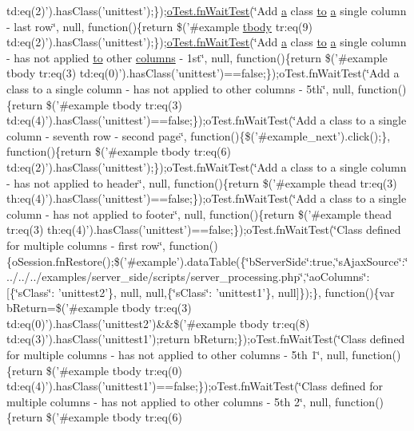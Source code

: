 \begin{DoxyCompactItemize}
td\+:eq(2)').has\+Class('unittest');\});\hyperlink{onhold_24__server-side_2__zero__config_8js_ab25c4d596771c0133cdc45178ce72c3d}{o\+Test.\+fn\+Wait\+Test}(\char`\"{}Add \hyperlink{media_2js_2jquery_8js_aa4d4888597588a84fd5b1184d00c91f3}{a} class \hyperlink{jquery-ui_8js_af6086621f45baa2cf538f19e45d3c263}{to} \hyperlink{media_2js_2jquery_8js_aa4d4888597588a84fd5b1184d00c91f3}{a} single column -\/ last row\char`\"{}, null, function()\{return \$('\#example \hyperlink{core_8constructor_8js_a99b0542c7c50fe8757c55bf9dac5f3be}{tbody} tr\+:eq(9) td\+:eq(2)').has\+Class('unittest');\});\hyperlink{onhold_24__server-side_2__zero__config_8js_ab25c4d596771c0133cdc45178ce72c3d}{o\+Test.\+fn\+Wait\+Test}(\char`\"{}Add \hyperlink{media_2js_2jquery_8js_aa4d4888597588a84fd5b1184d00c91f3}{a} class \hyperlink{jquery-ui_8js_af6086621f45baa2cf538f19e45d3c263}{to} \hyperlink{media_2js_2jquery_8js_aa4d4888597588a84fd5b1184d00c91f3}{a} single column -\/ has not applied \hyperlink{jquery-ui_8js_af6086621f45baa2cf538f19e45d3c263}{to} other \hyperlink{model_8defaults_8columns_8js_af310571d7a4fac04bd949bdefb852a47}{columns} -\/ 1st\char`\"{}, null, function()\{return \$('\#example tbody tr\+:eq(3) td\+:eq(0)').\+has\+Class('unittest')==false;\});o\+Test.\+fn\+Wait\+Test(\char`\"{}\+Add a class to a single column -\/ has not applied to other columns -\/ 5th\char`\"{}, null, function()\{return \$('\#example tbody tr\+:eq(3) td\+:eq(4)').\+has\+Class('unittest')==false;\});o\+Test.\+fn\+Wait\+Test(\char`\"{}\+Add a class to a single column -\/ seventh row -\/ second page\char`\"{}, function()\{\$('\#example\+\_\+next').\+click();\}, function()\{return \$('\#example tbody tr\+:eq(6) td\+:eq(2)').\+has\+Class('unittest');\});o\+Test.\+fn\+Wait\+Test(\char`\"{}\+Add a class to a single column -\/ has not applied to header\char`\"{}, null, function()\{return \$('\#example thead tr\+:eq(3) th\+:eq(4)').\+has\+Class('unittest')==false;\});o\+Test.\+fn\+Wait\+Test(\char`\"{}\+Add a class to a single column -\/ has not applied to footer\char`\"{}, null, function()\{return \$('\#example thead tr\+:eq(3) th\+:eq(4)').\+has\+Class('unittest')==false;\});o\+Test.\+fn\+Wait\+Test(\char`\"{}\+Class defined for multiple columns -\/ first row\char`\"{}, function()\{o\+Session.\+fn\+Restore();\$('\#example').\+data\+Table(\{\char`\"{}b\+Server\+Side\char`\"{}\+:true,\char`\"{}s\+Ajax\+Source\char`\"{}\+:\char`\"{}../../../examples/server\+\_\+side/scripts/server\+\_\+processing.\+php\char`\"{},\char`\"{}ao\+Columns\char`\"{}\+:\mbox{[}\{\char`\"{}s\+Class\char`\"{}\+: 'unittest2'\}, null, null,\{\char`\"{}s\+Class\char`\"{}\+: 'unittest1'\}, null\mbox{]}\});\}, function()\{var b\+Return=\$('\#example tbody tr\+:eq(3) td\+:eq(0)').\+has\+Class('unittest2')\&\&\$('\#example tbody tr\+:eq(8) td\+:eq(3)').\+has\+Class('unittest1');return b\+Return;\});o\+Test.\+fn\+Wait\+Test(\char`\"{}\+Class defined for multiple columns -\/ has not applied to other columns -\/ 5th 1\char`\"{}, null, function()\{return \$('\#example tbody tr\+:eq(0) td\+:eq(4)').\+has\+Class('unittest1')==false;\});o\+Test.\+fn\+Wait\+Test(\char`\"{}\+Class defined for multiple columns -\/ has not applied to other columns -\/ 5th 2\char`\"{}, null, function()\{return \$('\#example tbody tr\+:eq(6) 
\end{DoxyCompactItemize}
